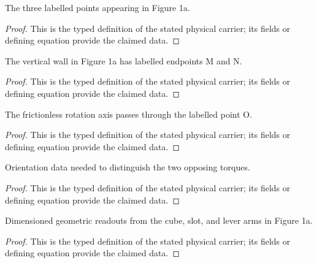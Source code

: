 \begin{definition}
  \label{def:physics:IPhO_2026_1_A_1:aux008}
  The three labelled points appearing in Figure 1a.
\end{definition}
\begin{proof}
  This is the typed definition of the stated physical carrier; its fields or defining equation provide the claimed data.
\end{proof}

\begin{definition}
  \label{def:physics:IPhO_2026_1_A_1:aux009}
  The vertical wall in Figure 1a has labelled endpoints M and N.
\end{definition}
\begin{proof}
  This is the typed definition of the stated physical carrier; its fields or defining equation provide the claimed data.
\end{proof}

\begin{definition}
  \label{def:physics:IPhO_2026_1_A_1:aux010}
  The frictionless rotation axis passes through the labelled point O.
\end{definition}
\begin{proof}
  This is the typed definition of the stated physical carrier; its fields or defining equation provide the claimed data.
\end{proof}

\begin{definition}
  \label{def:physics:IPhO_2026_1_A_1:aux011}
  Orientation data needed to distinguish the two opposing torques.
\end{definition}
\begin{proof}
  This is the typed definition of the stated physical carrier; its fields or defining equation provide the claimed data.
\end{proof}

\begin{definition}
  \label{def:physics:IPhO_2026_1_A_1:aux012}
  Dimensioned geometric readouts from the cube, slot, and lever arms in Figure 1a.
\end{definition}
\begin{proof}
  This is the typed definition of the stated physical carrier; its fields or defining equation provide the claimed data.
\end{proof}

